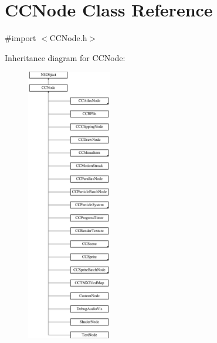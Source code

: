 \hypertarget{class_c_c_node}{\section{C\-C\-Node Class Reference}
\label{class_c_c_node}
}


{\ttfamily \#import $<$C\-C\-Node.\-h$>$}

Inheritance diagram for C\-C\-Node\-:\begin{figure}[H]
\begin{center}
\leavevmode
\includegraphics[height=12.000000cm]{class_c_c_node}
\end{center}
\end{figure}
